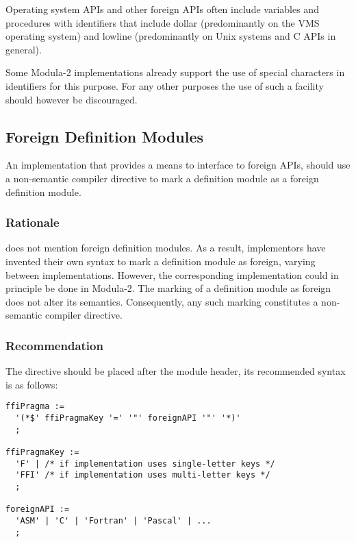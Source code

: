\documentclass[10pt,a4paper]{article} %
\begin{document}
Operating system \Glspl{API} and other \glspl{foreign API} often include variables and procedures with identifiers that include dollar (predominantly on the VMS operating system) and lowline (predominantly on Unix systems and C \glspl{API} in general).

Some Modula-2 implementations already support the use of special characters in identifiers for this purpose. For any other purposes the use of such a facility should however be discouraged.


\subsection{Foreign Definition Modules}

An implementation that provides a means to interface to \glspl{foreign API}, should use a \gls{non-semantic compiler directive} to mark a definition module as a \gls{foreign definition module}.

\subsubsection{Rationale}

\cite{Wirth88} does not mention \glspl{foreign definition module}. As a result, implementors have invented their own syntax to mark a definition module as foreign, varying between implementations. However, the corresponding implementation could in principle be done in Modula-2. The marking of a definition module as foreign does not alter its semantics. Consequently, any such marking constitutes a \gls{non-semantic compiler directive}.

\subsubsection{Recommendation}

The directive should be placed after the module header, its recommended syntax is as follows:

\begin{verbatim}
ffiPragma :=
  '(*$' ffiPragmaKey '=' '"' foreignAPI '"' '*)'
  ;
  
ffiPragmaKey :=
  'F' | /* if implementation uses single-letter keys */
  'FFI' /* if implementation uses multi-letter keys */
  ; 

foreignAPI :=
  'ASM' | 'C' | 'Fortran' | 'Pascal' | ...
  ;
\end{verbatim}
\end{document}
